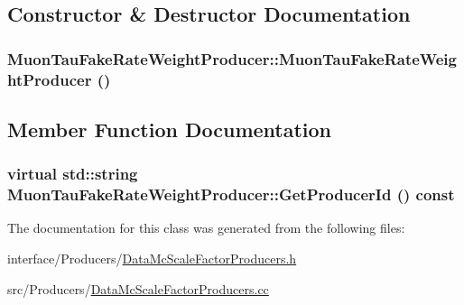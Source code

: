 \subsection{Constructor \& Destructor Documentation}
\hypertarget{classMuonTauFakeRateWeightProducer_a5ec8fe08d3c322ec95e5c94f58623654}{
\subsubsection[{MuonTauFakeRateWeightProducer}]{\setlength{\rightskip}{0pt plus 5cm}MuonTauFakeRateWeightProducer::MuonTauFakeRateWeightProducer ()}}
\label{classMuonTauFakeRateWeightProducer_a5ec8fe08d3c322ec95e5c94f58623654}


\subsection{Member Function Documentation}
\hypertarget{classMuonTauFakeRateWeightProducer_ae094152bca1c98c2508ce761e7b2dcbe}{
\subsubsection[{GetProducerId}]{\setlength{\rightskip}{0pt plus 5cm}virtual std::string MuonTauFakeRateWeightProducer::GetProducerId () const}}
\label{classMuonTauFakeRateWeightProducer_ae094152bca1c98c2508ce761e7b2dcbe}


The documentation for this class was generated from the following files:\begin{DoxyCompactItemize}
\item 
interface/Producers/\hyperlink{DataMcScaleFactorProducers_8h}{DataMcScaleFactorProducers.h}\item 
src/Producers/\hyperlink{DataMcScaleFactorProducers_8cc}{DataMcScaleFactorProducers.cc}\end{DoxyCompactItemize}
